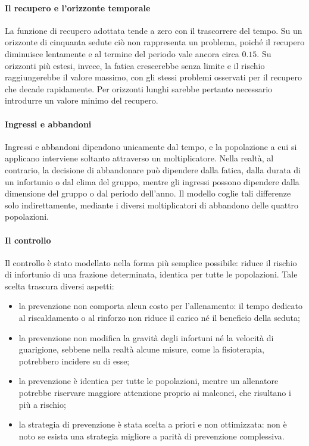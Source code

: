 \paragraph{Il recupero e l'orizzonte temporale}

La funzione di recupero adottata tende a zero con il trascorrere del tempo. Su un orizzonte di cinquanta sedute ciò non rappresenta un problema, poiché il recupero diminuisce lentamente e al termine del periodo vale ancora circa $0.15$. Su orizzonti più estesi, invece, la fatica crescerebbe senza limite e il rischio raggiungerebbe il valore massimo, con gli stessi problemi osservati per il recupero che decade rapidamente. Per orizzonti lunghi sarebbe pertanto necessario introdurre un valore minimo del recupero.

\paragraph{Ingressi e abbandoni}

Ingressi e abbandoni dipendono unicamente dal tempo, e la popolazione a cui si applicano interviene soltanto attraverso un moltiplicatore. Nella realtà, al contrario, la decisione di abbandonare può dipendere dalla fatica, dalla durata di un infortunio o dal clima del gruppo, mentre gli ingressi possono dipendere dalla dimensione del gruppo o dal periodo dell'anno. Il modello coglie tali differenze solo indirettamente, mediante i diversi moltiplicatori di abbandono delle quattro popolazioni.

\paragraph{Il controllo}

Il controllo è stato modellato nella forma più semplice possibile: riduce il rischio di infortunio di una frazione determinata, identica per tutte le popolazioni. Tale scelta trascura diversi aspetti:
\begin{itemize}
    \item la prevenzione non comporta alcun costo per l'allenamento: il tempo dedicato al riscaldamento o al rinforzo non riduce il carico né il beneficio della seduta;
    \item la prevenzione non modifica la gravità degli infortuni né la velocità di guarigione, sebbene nella realtà alcune misure, come la fisioterapia, potrebbero incidere su di esse;
    \item la prevenzione è identica per tutte le popolazioni, mentre un allenatore potrebbe riservare maggiore attenzione proprio ai malconci, che risultano i più a rischio;
    \item la strategia di prevenzione è stata scelta a priori e non ottimizzata: non è noto se esista una strategia migliore a parità di prevenzione complessiva.
\end{itemize}

